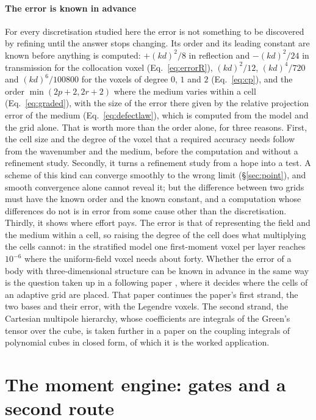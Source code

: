 \documentclass[preprint,review,12pt]{elsarticle}
\begin{document}
\paragraph{The error is known in advance} For every discretisation studied here the error is not
something to be discovered by refining until the answer stops changing. Its order and its leading
constant are known before anything is computed: $+(kd)^2/8$ in reflection and $-(kd)^2/24$ in
transmission for the collocation voxel (Eq.~\eqref{eq:errorR}), $(kd)^2/12$, $(kd)^4/720$ and
$(kd)^6/100800$ for the voxels of degree $0$, $1$ and $2$ (Eq.~\eqref{eq:cp}), and the order
$\min(2p+2,2r+2)$ where the medium varies within a cell (Eq.~\eqref{eq:graded}), with the size of the
error there given by the relative projection error of the medium (Eq.~\eqref{eq:defectlaw}), which is
computed from the model and the grid alone. That is worth more than
the order alone, for three reasons. First, the cell size and the degree of the voxel that a required
accuracy needs follow from the wavenumber and the medium, before the computation and without a
refinement study. Secondly, it turns a refinement study from a hope into a test. A scheme of this kind
can converge smoothly to the wrong limit (\S\ref{sec:point}), and smooth convergence alone cannot
reveal it; but the difference between two grids must have the known order and the known constant, and
a computation whose differences do not is in error from some cause other than the discretisation.
Thirdly, it shows where effort pays. The error is that of representing the field and the medium within
a cell, so raising the degree of the cell does what multiplying the cells cannot: in the stratified
model one first-moment voxel per layer reaches $10^{-6}$ where the uniform-field voxel needs about forty.
Whether the error of a body with three-dimensional structure can be known in advance in the same way is
the question taken up in a following paper \citep{NestorOctree2026}, where it decides where the cells of an adaptive grid are placed.
That paper continues the paper's first strand, the two bases and their error, with the Legendre voxels.
The second strand, the Cartesian multipole hierarchy, whose coefficients are integrals of the Green's tensor over the
cube, is taken further in a paper on the coupling integrals of polynomial cubes in closed form, of which
it is the worked application.

\appendix

\section{The moment engine: gates and a second route}\label{app:engine}
\end{document}
